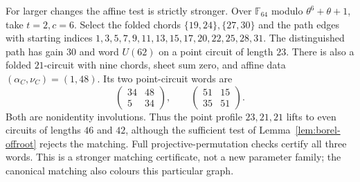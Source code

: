\documentclass[11pt,a4paper]{article}
\theoremstyle{definition}
\theoremstyle{remark}
\begin{document}
For larger changes the affine test is strictly stronger.  Over $\mathbb F_{64}$ modulo $\theta^6+\theta+1$, take $t=2,c=6$.  Select the folded chords $\{19,24\},\{27,30\}$ and the path edges with starting indices $1,3,5,7,9,11,13,15,17,20,22,25,28,31$.  The distinguished path has gain $30$ and word $U(62)$ on a point circuit of length $23$.  There is also a folded $21$-circuit with nine chords, sheet sum zero, and affine data $(\alpha_C,\nu_C)=(1,48)$.  Its two point-circuit words are
\[
 \begin{pmatrix}34&48\\5&34\end{pmatrix},\qquad
 \begin{pmatrix}51&15\\35&51\end{pmatrix}.
\]
Both are nonidentity involutions.  Thus the point profile $23,21,21$ lifts to even circuits of lengths $46$ and $42$, although the sufficient test of Lemma~\ref{lem:borel-offroot} rejects the matching.  Full projective-permutation checks certify all three words.  This is a stronger matching certificate, not a new parameter family; the canonical matching also colours this particular graph.
\end{document}
